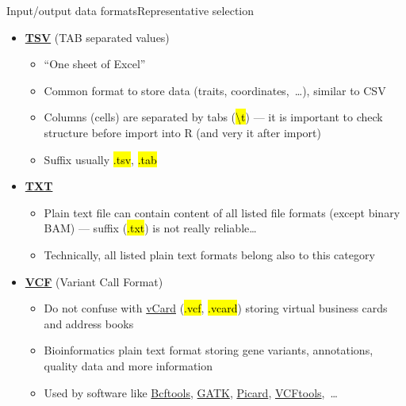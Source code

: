 \documentclass[compress, ucs, xelatex, 11pt, xcolor=svgnames,
  hyperref={
    bookmarks=true,
    unicode=true,
    colorlinks=true,
    pdftitle={Molecular data in R},
    plainpages=false,
    pdfauthor={Vojtech Zeisek},
    pdfsubject={Course about phylogeny and evolution in R},
    pdfcreator={XeLaTeX},
    pdfkeywords={R, evolution, phylogeny, molecular data},
    linkcolor=Tomato,
    anchorcolor=SaddleBrown,
    citecolor=Goldenrod,
    filecolor=DarkMagenta,
    menucolor=Sienna,
    urlcolor=DarkTurquoise,
    pdftex},
  url={hyphens, lowtilde} %
  ]{beamer}
\renewcommand{\texttt}[1]{\hl{\ttfamily #1}}
\begin{document}
\begin{frame}[allowframebreaks]{Input/output data formats}{Representative selection}
\begin{itemize}
    \begin{itemize}
      \item Text-based format for storing biological sequences aligned to a~reference sequence
      \item Structure is relatively complex
      \item Used by applications like \href{https://github.com/pezmaster31/bamtools/wiki}{bamtools} or \href{http://www.htslib.org/}{SAMtools}
      \item Suffix usually \texttt{*.sam}
    \end{itemize}
    \item \href{https://en.wikipedia.org/wiki/Tab-separated_values}{\textbf{TSV}} (TAB separated values)
    \begin{itemize}
     \item ``One sheet of Excel''
      \item Common format to store data (traits, coordinates,~\ldots), similar to CSV
      \item Columns (cells) are separated by tabs (\texttt{\textbackslash t}) --- it is important to check structure before import into R (and very it after import)
      \item Suffix usually \texttt{*.tsv}, \texttt{*.tab}
    \end{itemize}
    \item \href{https://en.wikipedia.org/wiki/Text_file}{\textbf{TXT}}
    \begin{itemize}
      \item Plain text file can contain content of all listed file formats (except binary BAM) --- suffix (\texttt{*.txt}) is not really reliable\ldots
      \item Technically, all listed plain text formats belong also to this category
    \end{itemize}
    \item \href{https://en.wikipedia.org/wiki/Variant_Call_Format}{\textbf{VCF}} (Variant Call Format)
    \begin{itemize}
      \item Do not confuse with \href{https://en.wikipedia.org/wiki/VCard}{vCard} (\texttt{*.vcf}, \texttt{*.vcard}) storing virtual business cards and address books
      \item Bioinformatics plain text format storing gene variants, annotations, quality data and more information
      \item Used by software like \href{https://samtools.github.io/bcftools/}{Bcftools}, \href{https://software.broadinstitute.org/gatk/}{GATK}, \href{https://broadinstitute.github.io/picard/}{Picard}, \href{https://vcftools.github.io/}{VCFtools},~\ldots

\end{itemize}
\end{itemize}
\end{frame}
\end{document}

